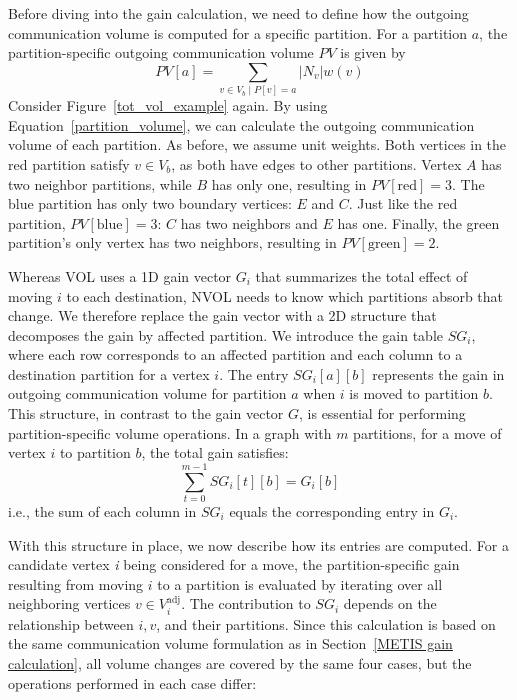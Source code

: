 Before diving into the gain calculation, we need to define how the outgoing communication volume is computed for a specific partition. For a partition $a$, the partition-specific outgoing communication volume $PV$ is given by
\begin{equation} \label{partition_volume}
	PV[a] = \sum_{v \in V_b \mid P[v] = a} \left| N_v \right| w(v)
\end{equation}
Consider Figure~\ref{tot_vol_example} again. By using Equation~\ref{partition_volume}, we can calculate the outgoing communication volume of each partition. As before, we assume unit weights. Both vertices in the red partition satisfy $v \in V_b$, as both have edges to other partitions. Vertex $A$ has two neighbor partitions, while $B$ has only one, resulting in $PV[\mathrm{red}] = 3$. The blue partition has only two boundary vertices: $E$ and $C$. Just like the red partition, $PV[\mathrm{blue}] = 3$: $C$ has two neighbors and $E$ has one. Finally, the green partition's only vertex has two neighbors, resulting in $PV[\mathrm{green}] = 2$.

Whereas VOL uses a 1D gain vector $G_i$ that summarizes the total effect of moving $i$ to each destination, NVOL needs to know which partitions absorb that change. We therefore replace the gain vector with a 2D structure that decomposes the gain by affected partition. We introduce the gain table $SG_i$, where each row corresponds to an affected partition and each column to a destination partition for a vertex $i$. The entry $SG_i[a][b]$ represents the gain in outgoing communication volume for partition $a$ when $i$ is moved to partition $b$. This structure, in contrast to the gain vector $G$, is essential for performing partition-specific volume operations. In a graph with $m$ partitions, for a move of vertex $i$ to partition $b$, the total gain satisfies:
\begin{equation}
	\sum_{t=0}^{m-1} SG_i[t][b] = G_i[b]
\end{equation}
i.e., the sum of each column in $SG_i$ equals the corresponding entry in $G_i$. 

With this structure in place, we now describe how its entries are computed. For a candidate vertex \textit{i} being considered for a move, the partition-specific gain resulting from moving $i$ to a partition is evaluated by iterating over all neighboring vertices $v \in V^{\mathrm{adj}}_i$. The contribution to $SG_i$ depends on the relationship between $i,v$, and their partitions. Since this calculation is based on the same communication volume formulation as in Section~\ref{METIS gain calculation}, all volume changes are covered by the same four cases, but the operations performed in each case differ:

